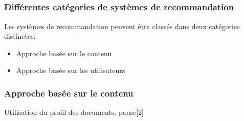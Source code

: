 \documentclass{beamer}
\begin{document}
        \subsection{}
            \begin{frame}
                \frametitle{Différentes catégories de systèmes de recommandation}
                Les systèmes de recommandation peuvent être classés dans deux catégories distinctes:
                \pause
                \begin{itemize}
                    \item Approche basée sur le contenu
                    \pause
                    \item Approche basée sur les utilisateurs
                \end{itemize}
            \end{frame}
            \begin{frame}
                \frametitle{Approche basée sur le contenu}
                    Utilisation du profil des documents.
                    pause[2]
                    \pause[5]
            \end{frame}
\end{document}
